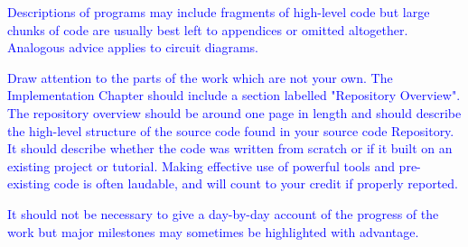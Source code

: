 \documentclass[12pt,twoside,notitlepage]{report}
\newcommand\note[1]{\textcolor{blue}{#1}}
\begin{document}
\note{Descriptions of programs may include fragments of high-level code but large chunks of code are usually best left to appendices or omitted altogether. Analogous advice applies to circuit diagrams.}

\note{Draw attention to the parts of the work which are not your own. The Implementation Chapter should include a section labelled "Repository Overview". The repository overview should be around one page in length and should describe the high-level structure of the source code found in your source code Repository. It should describe whether the code was written from scratch or if it built on an existing project or tutorial. Making effective use of powerful tools and pre-existing code is often laudable, and will count to your credit if properly reported.}

\note{It should not be necessary to give a day-by-day account of the progress of the work but major milestones may sometimes be highlighted with advantage. }

\end{document}
